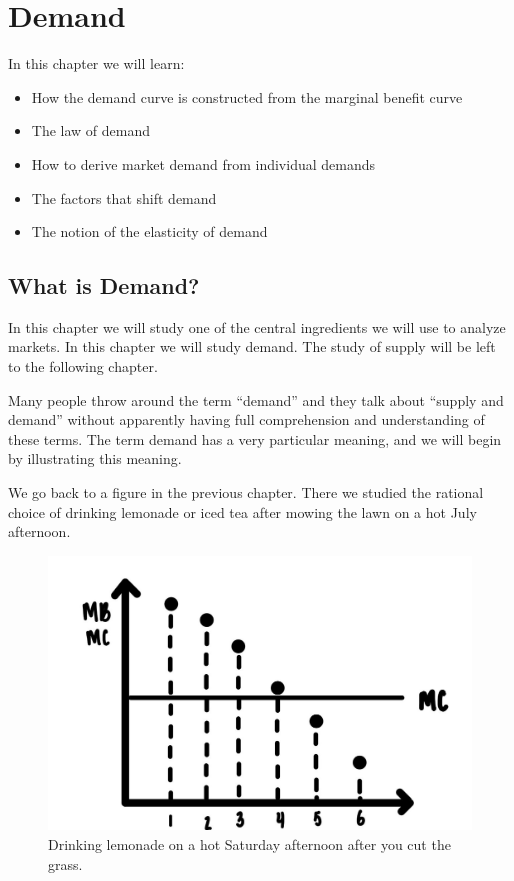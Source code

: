 \documentclass[
]{book}
\providecommand{\tightlist}{%
  \setlength{\itemsep}{0pt}\setlength{\parskip}{0pt}}
\begin{document}
\hypertarget{demand}{%
\chapter{Demand}\label{demand}}

In this chapter we will learn:

\begin{itemize}
\tightlist
\item
  How the demand curve is constructed from the marginal benefit curve
\item
  The law of demand
\item
  How to derive market demand from individual demands\\
\item
  The factors that shift demand
\item
  The notion of the elasticity of demand
\end{itemize}

\hypertarget{what-is-demand}{%
\section{What is Demand?}\label{what-is-demand}}

In this chapter we will study one of the central ingredients we will use to analyze markets. In this chapter we will study demand. The study of supply will be left to the following chapter.

Many people throw around the term ``demand'' and they talk about ``supply and demand'' without apparently having full comprehension and understanding of these terms. The term demand has a very particular meaning, and we will begin by illustrating this meaning.

We go back to a figure in the previous chapter. There we studied the rational choice of drinking lemonade or iced tea after mowing the lawn on a hot July afternoon.

\begin{figure}

{\centering \includegraphics[width=0.5\linewidth]{img/ch2/fig6} 

}

\caption{Drinking lemonade on a hot Saturday afternoon after you cut the grass.}\label{fig:fig301}
\end{figure}
\end{document}
